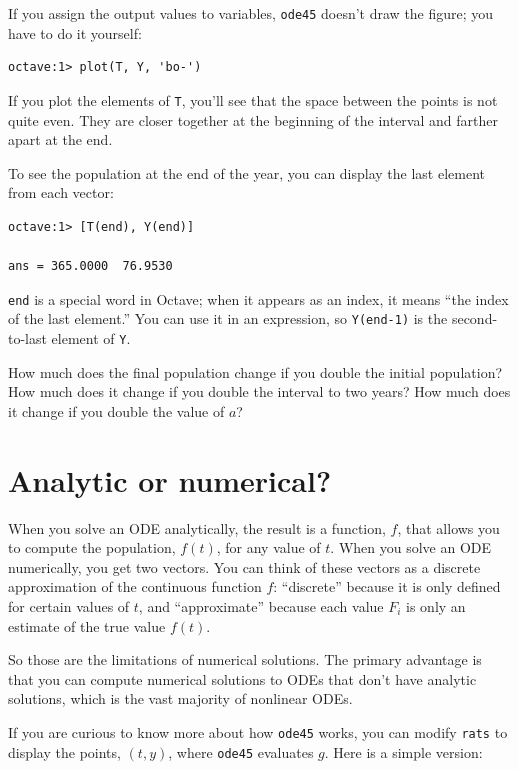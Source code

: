 \documentclass{book}
\begin{document}
If you assign the output values to variables,
{\tt ode45} doesn't draw the figure;
you have to do it yourself:

\begin{verbatim}
octave:1> plot(T, Y, 'bo-')
\end{verbatim}

If you plot the elements of {\tt T}, you'll see that the
space between the points is not quite even. They are closer
together at the beginning of the interval and farther apart at the end.

To see the population at the end of the year, you can display the
last element from each vector:

\begin{verbatim}
octave:1> [T(end), Y(end)]

ans = 365.0000  76.9530
\end{verbatim}

{\tt end} is a special word in Octave; when it appears as an index,
it means ``the index of the last element.'' You can use it in an
expression, so {\tt Y(end-1)} is the second-to-last element of
{\tt Y}.

How much does the final population change if you double the initial
population? How much does it change if you double the interval
to two years? How much does it change if you double the value
of $a$?


\section{Analytic or numerical?}

When you solve an ODE analytically, the result is a function, $f$,
that allows you to compute the population, $f(t)$, for any value of
$t$. When you solve an ODE numerically, you get two vectors. You can
think of these vectors as a discrete approximation of the continuous
function $f$: ``discrete'' because it is only defined for certain
values of $t$, and ``approximate'' because each value $F_i$
is only an estimate of the true value $f(t)$.

So those are the limitations of numerical solutions. The primary
advantage is that you can compute numerical solutions to ODEs that
don't have analytic solutions, which is the vast majority
of nonlinear ODEs.

If you are curious to know more about how {\tt ode45} works, you
can modify {\tt rats} to display the points, $(t, y)$, where
{\tt ode45} evaluates $g$. Here is a simple version:
\end{document}
